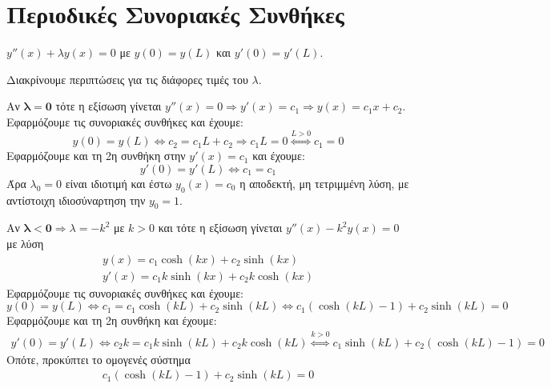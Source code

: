 \documentclass[a4paper,table]{report}
\begin{document}
\section*{Περιοδικές Συνοριακές Συνθήκες}


\begin{mybox3}
\begin{example}
  $ y''(x) + \lambda y(x)=0 $ με $ y(0)=y(L) $ και $ y'(0)=y'(L) $.
\end{example}
\end{mybox3}
\begin{solution}
  Διακρίνουμε περιπτώσεις για τις διάφορες τιμές του $ \lambda $.
  \begin{myitemize}
    \item Αν $ \bm{\lambda = 0} $ τότε η εξίσωση γίνεται 
      $ y''(x)=0 \Rightarrow y'(x) = c_{1} \Rightarrow y(x) = c_{1}x + c_{2} $. 
      Εφαρμόζουμε τις συνοριακές συνθήκες και έχουμε:
      \[
        y(0)=y(L) \Leftrightarrow c_{2}= c_{1}L + c_{2} \Rightarrow c_{1}L=0
        \overset{L>0}{\Leftrightarrow} c_{1} = 0
      \] 
      Εφαρμόζουμε και τη 2η συνθήκη στην $ y'(x)= c_{1} $ και έχουμε:
      \[
        y'(0)=y'(L) \Leftrightarrow c_{1} = c_{1}
      \]
      Άρα $ \lambda_{0}=0 $ είναι ιδιοτιμή και έστω $ y_{0}(x)=c_{0} $ η αποδεκτή, 
      μη τετριμμένη λύση, με αντίστοιχη ιδιοσύναρτηση την $y_{0}=1 $. 
    \item Αν $ \bm{\lambda < 0} \Rightarrow \lambda = -k^{2} $ με $ k>0 $ και τότε η 
      εξίσωση γίνεται $ y''(x) -k^{2}y(x)=0$ με λύση 
      \begin{align*} 
        y(x) = c_{1} \cosh{(kx)} + c_{2} \sinh{(kx)} \\
        y'(x) = c_{1}k \sinh{(kx)} + c_{2}k \cosh{(kx)} 
      \end{align*}
      Εφαρμόζουμε τις συνοριακές συνθήκες και έχουμε:
      \[
        y(0)=y(L) \Leftrightarrow  c_{1} = c_{1} \cosh{(kL)} + c_{2} \sinh{(kL)} 
        \Leftrightarrow c_{1}(\cosh{(kL)} -1) + c_{2} \sinh{(kL)} = 0
      \] 
      Εφαρμόζουμε και τη 2η συνθήκη και έχουμε:
      \begin{gather*}
        y'(0)=y'(L) \Leftrightarrow c_{2}k = c_{1}k \sinh{(kL)} + c_{2}k \cosh{(kL)} 
        \overset{k > 0}{\Leftrightarrow} 
         c_{1} \sinh{(kL)} + c_{2} (\cosh{(kL)} -1) = 0
      \end{gather*}
      Οπότε, προκύπτει το ομογενές σύστημα 
      \[
        \left.
          \begin{matrix}
            c_{1}(\cosh{(kL)} -1) + c_{2} \sinh{(kL)} = 0 \\

\end{matrix}\]
\end{myitemize}
\end{solution}
\end{document}
